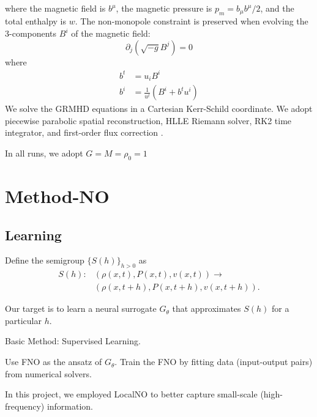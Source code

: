 \documentclass{article}
\begin{document}
where the magnetic field is $b^\mu$, the magnetic pressure is $p_m= b_\mu b^\mu/2$, and the total enthalpy is $w$. 
The non-monopole constraint is preserved when evolving the 3-components $B^i$ of the magnetic field: 
\begin{equation}
    \partial_j (\sqrt{-g} B^j)=0
\end{equation}
where 
\begin{align}
    b^t &= u_i B^i \\
    b^i &= \frac{1}{u^t}(B^i+b^tu^i)
\end{align}
We solve the GRMHD equations in a Cartesian Kerr-Schild coordinate. 
We adopt piecewise parabolic spatial reconstruction, HLLE Riemann solver, RK2 time integrator, and first-order flux correction \cite{2009ApJ...691.1092L}.

In all runs, we adopt $G=M=\rho_0=1$


\section{Method-NO}
\label{sec:method-no}




\subsection{Learning}
Define the semigroup $\{S(h)\}_{h>0}$  as 
\begin{align}
    S(h): &(\rho(x,t),P(x,t),v(x,t))\to \nonumber \\
    &(\rho(x,t+h),P(x,t+h),v(x,t+h)).
\end{align}

Our target is to learn a neural surrogate $G_\theta$ that approximates $S(h)$ for a particular $h$. 

Basic Method: Supervised Learning.

Use FNO as the ansatz of $G_\theta$. Train the FNO by fitting data (input-output pairs) from numerical solvers.

In this project, we employed LocalNO to better capture small-scale (high-frequency) information.
\end{document}
